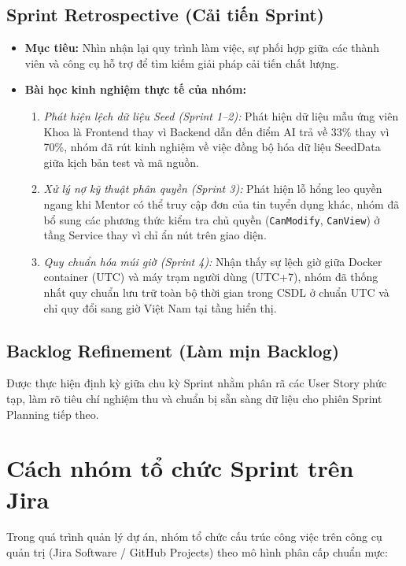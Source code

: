 \subsection{Sprint Retrospective (Cải tiến Sprint)}
\begin{itemize}
    \item \textbf{Mục tiêu:} Nhìn nhận lại quy trình làm việc, sự phối hợp giữa các thành viên và công cụ hỗ trợ để tìm kiếm giải pháp cải tiến chất lượng.
    \item \textbf{Bài học kinh nghiệm thực tế của nhóm:}
    \begin{enumerate}
        \item \textit{Phát hiện lệch dữ liệu Seed (Sprint 1--2):} Phát hiện dữ liệu mẫu ứng viên Khoa là Frontend thay vì Backend dẫn đến điểm AI trả về 33\% thay vì 70\%, nhóm đã rút kinh nghiệm về việc đồng bộ hóa dữ liệu SeedData giữa kịch bản test và mã nguồn.
        \item \textit{Xử lý nợ kỹ thuật phân quyền (Sprint 3):} Phát hiện lỗ hổng leo quyền ngang khi Mentor có thể truy cập đơn của tin tuyển dụng khác, nhóm đã bổ sung các phương thức kiểm tra chủ quyền (\texttt{CanModify}, \texttt{CanView}) ở tầng Service thay vì chỉ ẩn nút trên giao diện.
        \item \textit{Quy chuẩn hóa múi giờ (Sprint 4):} Nhận thấy sự lệch giờ giữa Docker container (UTC) và máy trạm người dùng (UTC+7), nhóm đã thống nhất quy chuẩn lưu trữ toàn bộ thời gian trong CSDL ở chuẩn UTC và chỉ quy đổi sang giờ Việt Nam tại tầng hiển thị.
    \end{enumerate}
\end{itemize}

\subsection{Backlog Refinement (Làm mịn Backlog)}
Được thực hiện định kỳ giữa chu kỳ Sprint nhằm phân rã các User Story phức tạp, làm rõ tiêu chí nghiệm thu và chuẩn bị sẵn sàng dữ liệu cho phiên Sprint Planning tiếp theo.

\section{Cách nhóm tổ chức Sprint trên Jira}
\label{sec:to-chuc-jira}

Trong quá trình quản lý dự án, nhóm tổ chức cấu trúc công việc trên công cụ quản trị (Jira Software / GitHub Projects) theo mô hình phân cấp chuẩn mực:


